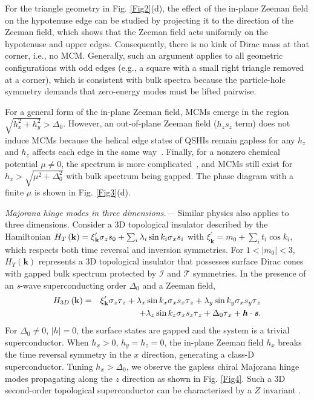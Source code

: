 \documentclass[twocolumn,prl,floatfix,citeautoscript,nofootinbib,superscriptaddress]{revtex4}
\begin{document}
For the triangle geometry in Fig. \ref{Fig2}(d), the effect of the in-plane
Zeeman field on the hypotenuse edge can be studied by projecting it to the
direction of the Zeeman field, which shows that the Zeeman field acts
uniformly on the hypotenuse and upper edges. Consequently, there is no kink
of Dirac mass at that corner, i.e., no MCM. Generally, such an argument
applies to all geometric configurations with odd edges (e.g., a square with
a small right triangle removed at a corner), which is consistent with bulk
spectra because the particle-hole symmetry demands that zero-energy modes
must be lifted pairwise.

For a general form of the in-plane Zeeman field, MCMs emerge in the region $%
\sqrt{h_{x}^{2}+h_{y}^{2}}>\Delta _{0}$. However, an out-of-plane Zeeman
field ($h_{z}s_{z}$ term) does not induce MCMs because the helical edge
states of QSHIs remain gapless for any $h_{z}$ and $h_{z}$ affects each edge
in the same way~\cite{SM}. Finally, for a nonzero chemical potential $\mu
\neq 0$, the spectrum is more complicated~\cite{SM}, and MCMs still exist
for $h_{x}>\sqrt{\mu ^{2}+\Delta _{0}^{2}}$ with bulk spectrum being gapped.
The phase diagram with a finite $\mu $ is shown in Fig. \ref{Fig3}(d).

{\color{blue}\emph{Majorana hinge modes in three dimensions.---}} Similar
physics also applies to three dimensions. Consider a 3D topological
insulator described by the Hamiltonian $H_{T}\left( \mathbf{k}\right) =\xi _{%
\mathbf{k}}^{\prime }\sigma _{z}s_{0}+\sum_{i}\lambda _{i}\sin k_{i}\sigma
_{x}s_{i}$ with $\xi _{\mathbf{k}}^{\prime }=m_{0}+\sum_{i}t_{i}\cos k_{i}$,
which respects both time reversal and inversion symmetries. For $%
1<\left\vert m_{0}\right\vert <3$, $H_{T}\left( \mathbf{k}\right) $
represents a 3D topological insulator that possesses surface Dirac cones
with gapped bulk spectrum protected by $\mathcal{I}$ and $\mathcal{T}$
symmetries. In the presence of an \textit{s}-wave superconducting order $%
\Delta _{0}$ and a Zeeman field,
\begin{eqnarray}
H_{3D}\left( \mathbf{k}\right)  &=&\xi _{\mathbf{k}}^{\prime }\sigma
_{z}\tau _{z}+\lambda _{x}\sin k_{x}\sigma _{x}s_{x}\tau _{z}+\lambda
_{y}\sin k_{y}\sigma _{x}s_{y}\tau _{z}  \notag \\
&&+\lambda _{z}\sin k_{z}\sigma _{x}s_{z}\tau _{z}+\Delta _{0}\tau _{x}+%
\bm{\mathit{h}}\cdot \bm{\mathit{s}}.
\end{eqnarray}%
For $\Delta _{0}\neq 0$, $\left\vert \bm{\mathit{h}}\right\vert =0$, the
surface states are gapped and the system is a trivial superconductor. When $%
h_{x}>0$, $h_{y}=h_{z}=0$, the in-plane Zeeman field $h_{x}$ breaks the time
reversal symmetry in the $x$ direction, generating a class-D superconductor.
Tuning $h_{x}>\Delta _{0}$, we observe the gapless chiral Majorana hinge
modes propagating along the $z$ direction as shown in Fig. \ref{Fig4}. Such
a 3D second-order topological superconductor can be characterized by a $Z$
invariant \cite{Geier2018}.
\end{document}
